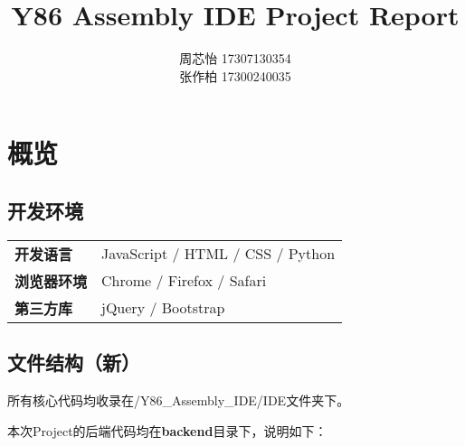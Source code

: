 \documentclass[a4paper,11pt,UTF8]{ctexart}
\title{\textbf{Y86 Assembly IDE Project Report}}
\author{周芯怡 17307130354\\张作柏 17300240035}
\begin{document}
\begin{sloppypar}
\maketitle

\pagestyle{fancy}
\lhead{\textbf{{\thetitle}}}
\rhead{\textbf{\nouppercase{\firstleftmark}}}
\cfoot{\thepage}

\tableofcontents
\clearpage



\section{概览}

\subsection{{\bf 开发环境}}

\begin{table}[h]
\begin{tabular}{ll}
{\bf 开发语言}   & JavaScript / HTML / CSS / Python  \\
{\bf 浏览器环境} & Chrome / Firefox / Safari \\
{\bf 第三方库}   & jQuery / Bootstrap                             
\end{tabular}
\end{table}

\subsection{{\bf 文件结构（新）}}

所有核心代码均收录在/Y86\_Assembly\_IDE/IDE文件夹下。

\noindent
本次Project的后端代码均在{\bf backend}目录下，说明如下：


\end{sloppypar}
\end{document}
